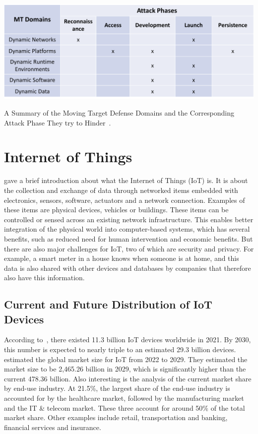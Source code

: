 \begin{table}[tph]
\includegraphics[scale=0.7]{assets/movingTargetDefenseAttack.png}
\centering
\caption{A Summary of the Moving Target Defense Domains and the Corresponding Attack Phase They try to Hinder~\cite{article:okhraviFindingFocus}.}
\label{table:movingTargetDefense}
\end{table}




\section{Internet of Things}
\cite{report:cern} gave a brief introduction about what the Internet of Things (IoT) is. It is about the collection and exchange of data through networked items embedded with electronics, sensors, software, actuators and a network connection. Examples of these items are physical devices, vehicles or buildings. These items can be controlled or sensed across an existing network infrastructure. This enables better integration of the physical world into computer-based systems, which has several benefits, such as reduced need for human intervention and economic benefits. But there are also major challenges for IoT, two of which are security and privacy. For example, a smart meter in a house knows when someone is at home, and this data is also shared with other devices and databases by companies that therefore also have this information.


\subsection{Current and Future Distribution of IoT Devices}
According to~\cite{website:statistaIoT}, there existed 11.3 billion IoT devices worldwide in 2021. By 2030, this number is expected to nearly triple to an estimated 29.3 billion devices.~\cite{website:fortuneIoT} estimated the global market size for IoT from 2022 to 2029. They estimated the market size to be 2,465.26 billion in 2029, which is significantly higher than the current 478.36 billion. Also interesting is the analysis of the current market share by end-use industry. At 21.5\%, the largest share of the end-use industry is accounted for by the healthcare market, followed by the manufacturing market and the IT \& telecom market. These three account for around 50\% of the total market share. Other examples include retail, transportation and banking, financial services and insurance.


